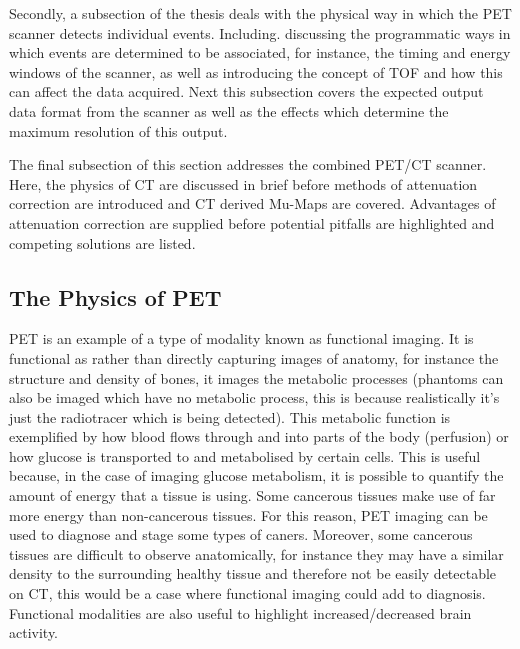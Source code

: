         Secondly, a subsection of the thesis deals with the physical way in which the \gls{PET} scanner detects individual events. Including. discussing the programmatic ways in which events are determined to be associated, for instance, the timing and energy windows of the scanner, as well as introducing the concept of \gls{TOF} and how this can affect the data acquired. Next this subsection covers the expected output data format from the scanner as well as the effects which determine the maximum resolution of this output.
        
        The final subsection of this section addresses the combined \gls{PET}/\gls{CT} scanner. Here, the physics of \gls{CT} are discussed in brief before methods of attenuation correction are introduced and \gls{CT} derived \glspl{Mu-Map} are covered. Advantages of attenuation correction are supplied before potential pitfalls are highlighted and competing solutions are listed.
        
        \subsection{The Physics of PET} \label{sec:the_physics_of_pet}
            
            \gls{PET} is an example of a type of modality known as functional imaging. It is functional as rather than directly capturing images of anatomy, for instance the structure and density of bones, it images the metabolic processes (phantoms can also be imaged which have no metabolic process, this is because realistically it's just the radiotracer which is being detected). This metabolic function is exemplified by how blood flows through and into parts of the body (perfusion) or how glucose is transported to and metabolised by certain cells. This is useful because, in the case of imaging glucose metabolism, it is possible to quantify the amount of energy that a tissue is using. Some cancerous tissues make use of far more energy than non-cancerous tissues. For this reason, PET imaging can be used to diagnose and stage some types of caners. Moreover, some cancerous tissues are difficult to observe anatomically, for instance they may have a similar density to the surrounding healthy tissue and therefore not be easily detectable on \gls{CT}, this would be a case where functional imaging could add to diagnosis. Functional modalities are also useful to highlight increased/decreased brain activity.
            
